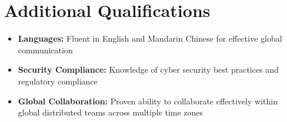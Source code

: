 \documentclass[11pt,a4paper]{article}
\begin{document}
\vspace{6pt}
\section*{Additional Qualifications}
\begin{itemize}[noitemsep]
\item \textbf{Languages:} Fluent in English and Mandarin Chinese for effective global communication
\item \textbf{Security Compliance:} Knowledge of cyber security best practices and regulatory compliance
\item \textbf{Global Collaboration:} Proven ability to collaborate effectively within global distributed teams across multiple time zones
\end{itemize}
\end{document}
